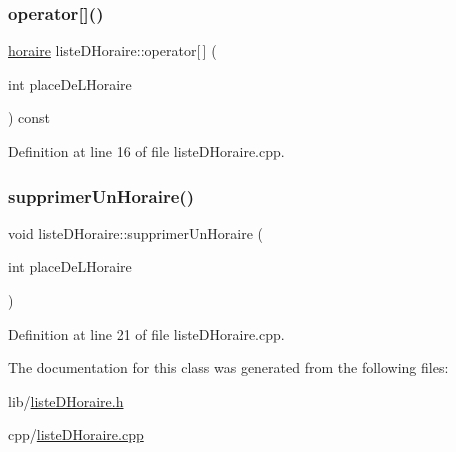 \subsubsection{\texorpdfstring{operator[]()}{operator[]()}}
{\footnotesize\ttfamily \hyperlink{classhoraire}{horaire} liste\+D\+Horaire\+::operator\mbox{[}$\,$\mbox{]} (\begin{DoxyParamCaption}\item[{int}]{place\+De\+L\+Horaire }\end{DoxyParamCaption}) const}



Definition at line 16 of file liste\+D\+Horaire.\+cpp.

\hypertarget{classliste_d_horaire_ad7e5d53b1c64285c908f9fe2e60aa61f}{}\label{classliste_d_horaire_ad7e5d53b1c64285c908f9fe2e60aa61f} 
\subsubsection{\texorpdfstring{supprimer\+Un\+Horaire()}{supprimerUnHoraire()}}
{\footnotesize\ttfamily void liste\+D\+Horaire\+::supprimer\+Un\+Horaire (\begin{DoxyParamCaption}\item[{int}]{place\+De\+L\+Horaire }\end{DoxyParamCaption})}



Definition at line 21 of file liste\+D\+Horaire.\+cpp.



The documentation for this class was generated from the following files\+:\begin{DoxyCompactItemize}
\item 
lib/\hyperlink{liste_d_horaire_8h}{liste\+D\+Horaire.\+h}\item 
cpp/\hyperlink{liste_d_horaire_8cpp}{liste\+D\+Horaire.\+cpp}\end{DoxyCompactItemize}
